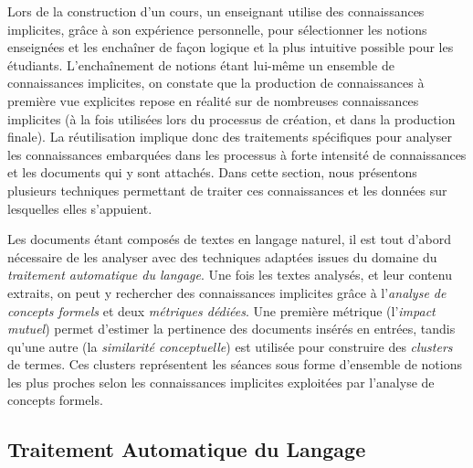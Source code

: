 Lors de la construction d'un cours, un enseignant utilise des connaissances implicites, grâce à son expérience personnelle, pour sélectionner les notions enseignées et les enchaîner de façon logique et la plus intuitive possible pour les étudiants.
L'enchaînement de notions étant lui-même un ensemble de connaissances implicites, on constate que la production de connaissances à première vue explicites repose en réalité sur de nombreuses connaissances implicites (à la fois utilisées lors du processus de création, et dans la production finale).
La réutilisation implique donc des traitements spécifiques pour analyser les connaissances embarquées dans les processus à forte intensité de connaissances et les documents qui y sont attachés.
Dans cette section, nous présentons plusieurs techniques permettant de traiter ces connaissances et les données sur lesquelles elles s'appuient.


\bigskip

Les documents étant composés de textes en langage naturel, il est tout d'abord nécessaire de les analyser avec des techniques adaptées issues du domaine du \textit{traitement automatique du langage}.
Une fois les textes analysés, et leur contenu extraits, on peut y rechercher des connaissances implicites grâce à l'\textit{analyse de concepts formels} et deux \textit{métriques dédiées}.
Une première métrique (l'\textit{impact mutuel}) permet d'estimer la pertinence des documents insérés en entrées, tandis qu'une autre (la \textit{similarité conceptuelle}) est utilisée pour construire des \textit{clusters} de termes.
Ces clusters représentent les séances sous forme d'ensemble de notions les plus proches selon les connaissances implicites exploitées par l'analyse de concepts formels.


\bigskip


\subsection{Traitement Automatique du Langage}
\label{subsection:Contexte:TechniquesUtilisees:TAL}

